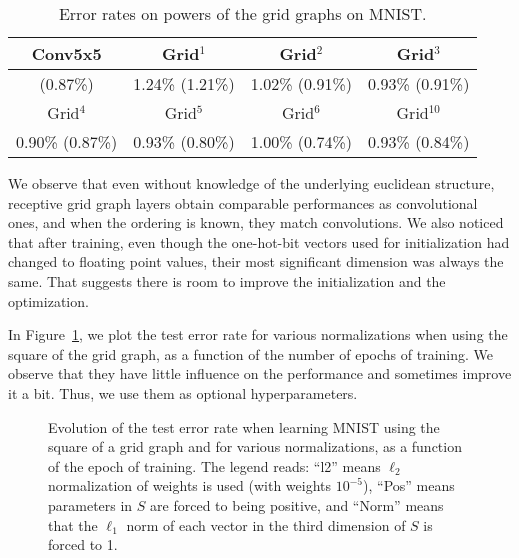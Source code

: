 \begin{table}[h]
  \caption{Error rates on powers of the grid graphs on MNIST.}
  \begin{center}
    \bgroup
    \def\arraystretch{1.5}%
    \begin{tabular}{|c|c|c|c|}
      \hline
      Conv5x5 & Grid$^1$ & Grid$^2$ & Grid$^3$\\
      \hline
      (0.87\%) & 1.24\% (1.21\%) & 1.02\% (0.91\%) & 0.93\% (0.91\%)\\
      \hline
      \hline
      Grid$^4$ & Grid$^5$ & Grid$^6$ & Grid$^{10}$\\
      \hline
      0.90\% (0.87\%) & 0.93\% (0.80\%) & 1.00\% (0.74\%) & 0.93\% (0.84\%)\\
      \hline
    \end{tabular}
    \egroup
  \end{center}
  \label{toy}
\end{table}

We observe that even without knowledge of the underlying euclidean structure, receptive grid graph layers obtain comparable performances as convolutional ones, and when the ordering is known, they match convolutions. We also noticed that after training, even though the one-hot-bit vectors used for initialization had changed  to floating point values, their most significant dimension was always the same. That suggests there is room to improve the initialization and the optimization.

In Figure~\ref{functionofepoch}, we plot the test error rate for various normalizations when using the square of the grid graph, as a function of the number of epochs of training. We observe that they have little influence on the performance and sometimes improve it a bit. Thus, we use them as optional hyperparameters.

\begin{figure}[h]
  \begin{center}
    
  \end{center}
  \caption{Evolution of the test error rate when learning MNIST using the square of a grid graph and for various normalizations, as a function of the epoch of training. The legend reads: ``l2'' means $\ell_2$ normalization of weights is used (with weights $10^{-5}$), ``Pos'' means parameters in $S$ are forced to being positive, and ``Norm'' means that the $\ell_1$ norm of each vector in the third dimension of $S$ is forced to 1.}
  \label{functionofepoch}
\end{figure}

